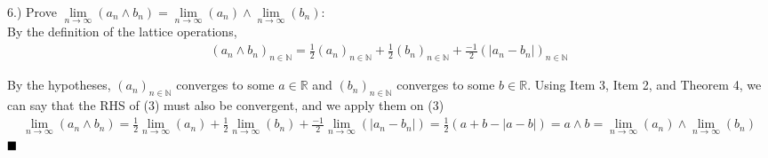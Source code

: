 \documentclass{book}
\begin{document}
6.) Prove $\lim \limits_{n \to \infty}{}(a_n \land b_n) = \lim \limits_{n \to \infty}{}(a_n) \land \lim \limits_{n \to \infty}{}(b_n)$: \\
By the definition of the lattice operations,
\begin{align}
    (a_n \land b_n)_{n \in \mathbb{N}} = \frac{1}{2} (a_n)_{n \in \mathbb{N}} + \frac{1}{2} (b_n)_{n \in \mathbb{N}} + \frac{-1}{2} (|a_n - b_n|)_{n \in \mathbb{N}}
\end{align}

By the hypotheses, $(a_n)_{n \in \mathbb{N}}$ converges to some $a \in \mathbb{R}$ and $(b_n)_{n \in \mathbb{N}}$ converges to some $b \in \mathbb{R}$. Using Item 3, Item 2, and Theorem 4, we can say that the RHS of (3) must also be convergent, and we apply them on (3)
\begin{align}
    \lim \limits_{n \to \infty}{}(a_n \land b_n) = \frac{1}{2} \lim \limits_{n \to \infty}{}(a_n) + \frac{1}{2} \lim \limits_{n \to \infty}{}(b_n) + \frac{-1}{2} \lim \limits_{n \to \infty}{}(|a_n - b_n|) = \frac{1}{2}(a + b - |a - b|) = a \land b = \lim \limits_{n \to \infty}{}(a_n) \land \lim \limits_{n \to \infty}{}(b_n)
\end{align}
$\hfill \blacksquare$ \\ \\






\end{document}
